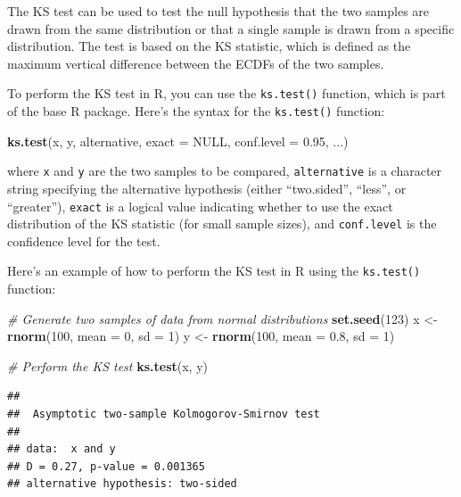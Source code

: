 \documentclass[
]{ctexart}
\newenvironment{Shaded}{\begin{snugshade}}{\end{snugshade}}
\newcommand{\AttributeTok}[1]{\textcolor[rgb]{0.13,0.29,0.53}{#1}}
\newcommand{\CommentTok}[1]{\textcolor[rgb]{0.56,0.35,0.01}{\textit{#1}}}
\newcommand{\ConstantTok}[1]{\textcolor[rgb]{0.56,0.35,0.01}{#1}}
\newcommand{\DecValTok}[1]{\textcolor[rgb]{0.00,0.00,0.81}{#1}}
\newcommand{\FloatTok}[1]{\textcolor[rgb]{0.00,0.00,0.81}{#1}}
\newcommand{\FunctionTok}[1]{\textcolor[rgb]{0.13,0.29,0.53}{\textbf{#1}}}
\newcommand{\NormalTok}[1]{#1}
\newcommand{\OtherTok}[1]{\textcolor[rgb]{0.56,0.35,0.01}{#1}}
\begin{document}
The KS test can be used to test the null hypothesis that the two samples
are drawn from the same distribution or that a single sample is drawn
from a specific distribution. The test is based on the KS statistic,
which is defined as the maximum vertical difference between the ECDFs of
the two samples.

To perform the KS test in R, you can use the \texttt{ks.test()}
function, which is part of the base R package. Here's the syntax for the
\texttt{ks.test()} function:

\begin{Shaded}
\begin{Highlighting}[]
\FunctionTok{ks.test}\NormalTok{(x, y, alternative, }
        \AttributeTok{exact =} \ConstantTok{NULL}\NormalTok{, }
        \AttributeTok{conf.level =} \FloatTok{0.95}\NormalTok{, ...)}
\end{Highlighting}
\end{Shaded}

where \texttt{x} and \texttt{y} are the two samples to be compared,
\texttt{alternative} is a character string specifying the alternative
hypothesis (either ``two.sided'', ``less'', or ``greater''),
\texttt{exact} is a logical value indicating whether to use the exact
distribution of the KS statistic (for small sample sizes), and
\texttt{conf.level} is the confidence level for the test.

Here's an example of how to perform the KS test in R using the
\texttt{ks.test()} function:

\begin{Shaded}
\begin{Highlighting}[]
\CommentTok{\# Generate two samples of data from normal distributions}
\FunctionTok{set.seed}\NormalTok{(}\DecValTok{123}\NormalTok{)}
\NormalTok{x }\OtherTok{\textless{}{-}} \FunctionTok{rnorm}\NormalTok{(}\DecValTok{100}\NormalTok{, }\AttributeTok{mean =} \DecValTok{0}\NormalTok{, }\AttributeTok{sd =} \DecValTok{1}\NormalTok{)}
\NormalTok{y }\OtherTok{\textless{}{-}} \FunctionTok{rnorm}\NormalTok{(}\DecValTok{100}\NormalTok{, }\AttributeTok{mean =} \FloatTok{0.8}\NormalTok{, }\AttributeTok{sd =} \DecValTok{1}\NormalTok{)}

\CommentTok{\# Perform the KS test}
\FunctionTok{ks.test}\NormalTok{(x, y)}
\end{Highlighting}
\end{Shaded}

\begin{verbatim}
## 
##  Asymptotic two-sample Kolmogorov-Smirnov test
## 
## data:  x and y
## D = 0.27, p-value = 0.001365
## alternative hypothesis: two-sided
\end{verbatim}
\end{document}
